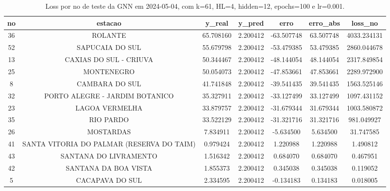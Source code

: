 \begin{table}[h]
\centering
\caption{Loss por no de teste da GNN em 2024-05-04, com k=61, HL=4, hidden=12, epochs=100 e lr=0.001.}
\label{tab:gnn_loss_k61_hl4_h12_e100_d20240504}
\begin{tabular}{ccccccc}
\toprule
no & estacao & y\_real & y\_pred & erro & erro\_abs & loss\_no \\
\midrule
36 & ROLANTE & 65.708160 & 2.200412 & -63.507748 & 63.507748 & 4033.234131 \\
52 & SAPUCAIA DO SUL & 55.679798 & 2.200412 & -53.479385 & 53.479385 & 2860.044678 \\
13 & CAXIAS DO SUL - CRIUVA & 50.344467 & 2.200412 & -48.144054 & 48.144054 & 2317.849854 \\
25 & MONTENEGRO & 50.054073 & 2.200412 & -47.853661 & 47.853661 & 2289.972900 \\
8 & CAMBARA DO SUL & 41.741848 & 2.200412 & -39.541435 & 39.541435 & 1563.525146 \\
32 & PORTO ALEGRE - JARDIM BOTANICO & 35.327911 & 2.200412 & -33.127499 & 33.127499 & 1097.431152 \\
23 & LAGOA VERMELHA & 33.879757 & 2.200412 & -31.679344 & 31.679344 & 1003.580872 \\
35 & RIO PARDO & 33.522129 & 2.200412 & -31.321716 & 31.321716 & 981.049927 \\
26 & MOSTARDAS & 7.834911 & 2.200412 & -5.634500 & 5.634500 & 31.747585 \\
41 & SANTA VITORIA DO PALMAR (RESERVA DO TAIM) & 0.979424 & 2.200412 & 1.220988 & 1.220988 & 1.490812 \\
43 & SANTANA DO LIVRAMENTO & 1.516342 & 2.200412 & 0.684070 & 0.684070 & 0.467951 \\
42 & SANTANA DA BOA VISTA & 1.855373 & 2.200412 & 0.345038 & 0.345038 & 0.119052 \\
5 & CACAPAVA DO SUL & 2.334595 & 2.200412 & -0.134183 & 0.134183 & 0.018005 \\
\bottomrule
\end{tabular}
\end{table}
